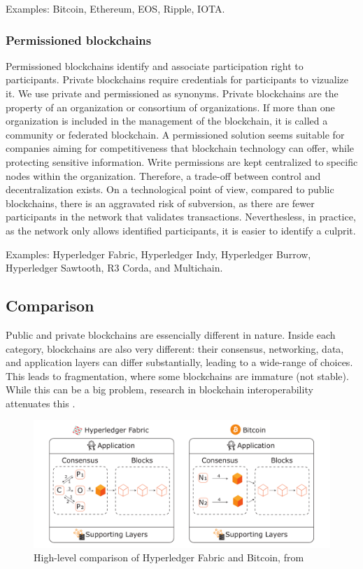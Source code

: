 \documentclass[12pt,a4paper]{article}
\theoremstyle{definition}
\begin{document}
Examples: Bitcoin, Ethereum, EOS, Ripple, IOTA.

\subsubsection{Permissioned blockchains}
Permissioned blockchains identify and associate participation right to participants. Private blockchains require credentials for participants to vizualize it. We use private and permissioned as synonyms. Private blockchains are the property of an organization or consortium of organizations. If more than one organization is included in the management of the blockchain, it is called a community or federated blockchain. A permissioned solution seems suitable for companies aiming for competitiveness that blockchain technology can offer, while protecting sensitive information. Write permissions are kept centralized to specific nodes within the organization. Therefore, a trade-off between control and decentralization exists. On a technological point of view, compared to public blockchains, there is an aggravated risk of subversion, as there are fewer participants in the network that validates transactions. Neverthesless, in practice, as the network only allows identified participants, it is easier to identify a culprit.

Examples: Hyperledger Fabric, Hyperledger Indy, Hyperledger Burrow, Hyperledger Sawtooth, R3 Corda, and Multichain.

\subsection{Comparison}
Public and private blockchains are essencially different in nature. Inside each category, blockchains are also very different: their consensus, networking, data, and application layers can differ substantially, leading to a wide-range of choices. This leads to fragmentation, where some blockchains are immature (not stable). While this can be a big problem, research in blockchain interoperability attenuates this \cite{belchior2020}. 

\begin{figure}
    \centering
    \includegraphics[scale=0.4]{figures/Fig1.pdf}
    \caption{High-level comparison of Hyperledger Fabric and Bitcoin, from \cite{belchior2020survey}}
    \label{fig:bcs}
\end{figure}
\end{document}
